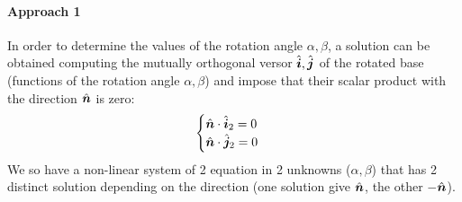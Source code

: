 		\paragraph{Approach 1} In order to determine the values of the rotation angle $\alpha,\beta$, a solution can be obtained computing the mutually orthogonal versor $\hat{\boldsymbol{i}},\hat{\boldsymbol{j}}$  of the rotated base (functions of the rotation angle $\alpha,\beta$) and impose that their scalar product with the direction $\hat{\boldsymbol{n}}$ is zero:
		\[ \begin{cases}
			\hat{\boldsymbol{n}}\cdot \hat{\boldsymbol{i}}_2 = 0 \\ \hat{\boldsymbol{n}} \cdot \hat{\boldsymbol{j}}_2 = 0
		\end{cases} \]
		We so have a non-linear system of 2 equation in 2 unknowns ($\alpha,\beta$) that has 2 distinct solution depending on the direction (one solution give $\hat{\boldsymbol{n}}$, the other $-\hat{\boldsymbol{n}}$).
		
